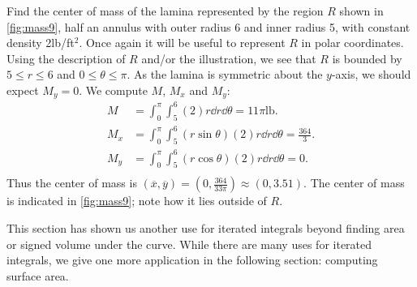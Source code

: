 \begin{example}\label{ex_mass9}%
Find the center of mass of the lamina represented by the region $R$ shown in \autoref{fig:mass9}, half an annulus with outer radius 6 and inner radius 5, with constant density 2lb/ft$^{2}$.
\solution
Once again it will be useful to represent $R$ in polar coordinates. Using the description of $R$ and/or the illustration, we see that $R$ is bounded by $5\leq r\leq 6$ and $0\leq\theta\leq\pi$. As the lamina is symmetric about the $y$-axis, we should expect $M_y=0$. We compute $M$, $M_x$ and $M_y$:
\begin{align*}
M &= \int_0^{\pi}\int_5^6 (2)r\dd r\dd\theta = 11\pi\text{lb}.\\
M_x &= \int_0^{\pi}\int_5^6 (r\sin\theta)(2)r\dd r\dd\theta = \frac{364}3%
.\\
M_y &= \int_0^{\pi}\int_5^6 (r\cos\theta)(2)r\dd r\dd\theta = 0.\\
\end{align*}
Thus the center of mass is $(\overline{x},\overline{y}) = \left(0,\frac{364}{33\pi}\right) \approx (0,3.51).$ The center of mass is indicated in \autoref{fig:mass9}; note how it lies outside of $R$.
\end{example}

This section has shown us another use for iterated integrals beyond finding area or signed volume under the curve. While there are many uses for iterated integrals, we give one more application in the following section: computing surface area.

